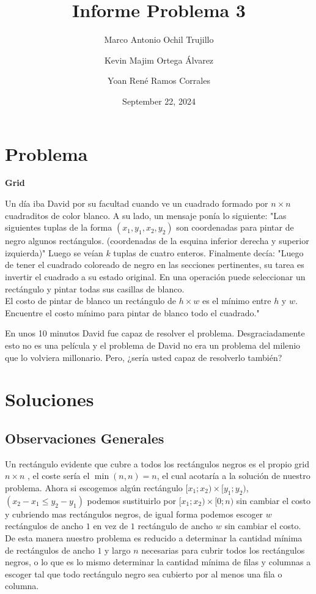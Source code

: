 \documentclass[12pt,a4paper]{report}
\title{Informe Problema 3}
\author{
    Marco Antonio Ochil Trujillo \\
    \and
    Kevin Majim Ortega \'Alvarez \\
    \and
    Yoan René Ramos Corrales \\
}
\date{September 22, 2024}
\begin{document}
\maketitle



\tableofcontents

\chapter{Problema}

\textbf{Grid}

Un día iba David por su facultad cuando ve un cuadrado formado por $n \times n$ cuadraditos de color blanco. A su lado, un mensaje ponía lo siguiente: "Las siguientes tuplas de la forma $(x_1, y_1, x_2, y_2)$ son coordenadas para pintar de negro algunos rectángulos. (coordenadas de la esquina inferior derecha y superior izquierda)" Luego se veían $k$ tuplas de cuatro enteros. Finalmente decía: "Luego de tener el cuadrado coloreado de negro en las secciones pertinentes, su tarea es invertir el cuadrado a su estado original. En una operación puede seleccionar un rectángulo y pintar todas sus casillas de blanco.\\ El costo de pintar de blanco un rectángulo de $h \times w$ es el mínimo entre $h$ y $w$. Encuentre el costo mínimo para pintar de blanco todo el cuadrado."

En unos 10 minutos David fue capaz de resolver el problema. Desgraciadamente esto no es una película y el problema de David no era un problema del milenio que lo volviera millonario. Pero, ¿sería usted capaz de resolverlo también?


\chapter{Soluciones}

\section{Observaciones Generales}
Un rectángulo evidente que cubre a todos los rectángulos negros es el propio grid $n \times n$ , el coste sería el $\min(n,n) = n$, el cual acotaría a la solución de nuestro problema. Ahora si escogemos algún rectángulo $[x_1;x_2) \times [y_1;y_2)$, $ ( x_2 - x_1 \leq y_2 - y_1 )$ podemos sustituirlo por $[x_1;x_2) \times [0;n)$ sin cambiar el costo y cubriendo mas rectángulos negros, de igual forma podemos escoger $w$ rectángulos de ancho $1$ en vez de $1$ rectángulo de ancho $w$ sin cambiar el costo. De esta manera nuestro problema es reducido a determinar la cantidad mínima de rectángulos de ancho $1$ y largo $n$ necesarias para cubrir todos los rectángulos negros, o lo que es lo mismo determinar la cantidad mínima de filas y columnas a escoger tal que todo rectángulo negro sea cubierto por al menos una fila o columna.
\newpage
\end{document}
